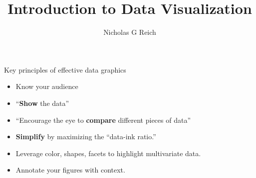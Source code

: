 \documentclass[table]{beamer}\usepackage[]{graphicx}\usepackage[]{color}
\title{Introduction to Data Visualization}
\author{Nicholas G Reich}
\begin{document}
\begin{frame}[plain]
	\titlepage
\end{frame}






\begin{frame}{Key principles of effective data graphics}

\begin{itemize}
    \item Know your audience
    \item ``{\bf Show} the data''
    \item ``Encourage the eye to {\bf compare} different pieces of data''
    \item {\bf Simplify} by maximizing the ``data-ink ratio.''
    \item Leverage color, shapes, facets to highlight multivariate data.
    \item Annotate your figures with context.
\end{itemize}

\end{frame}



% 
% 
\end{document}
